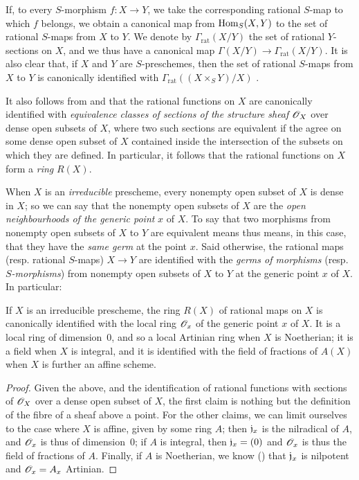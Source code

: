 If, to every $S$-morphism $f\colon X\to Y$, we take the corresponding rational $S$-map to which $f$ belongs, we obtain a canonical map from ${\mathop{\mathrm{Hom}}\nolimits}_S(X,Y)$ to the set of rational $S$-maps from $X$ to $Y$.
We denote by $\Gamma_\mathrm{rat}(X/Y)$ the set of rational $Y$-sections on $X$, and we thus have a canonical map $\Gamma(X/Y)\to\Gamma_\mathrm{rat}(X/Y)$.
It is also clear that, if $X$ and $Y$ are $S$-preschemes, then the set of rational $S$-maps from $X$ to $Y$ is canonically identified with $\Gamma_\mathrm{rat}((X\times_S Y)/X)$ .

\begin{env}[7.1.3]
\label{1.7.1.3}
It also follows from  and  that the rational functions on $X$ are canonically identified with \emph{equivalence classes of sections of the structure sheaf $\mathscr{O}_X$} over dense open subsets of $X$, where two such sections are equivalent if the agree on some dense open subset of $X$ contained inside the intersection of the subsets on which they are defined.
In particular, it follows that the rational functions on $X$ form a \emph{ring} $R(X)$.
\end{env}

\begin{env}[7.1.4]
\label{1.7.1.4}
When $X$ is an \emph{irreducible} prescheme, every nonempty open subset of $X$ is dense in $X$; so we can say that the nonempty open subsets of $X$ are the \emph{open neighbourhoods of the generic point} $x$ of $X$.
To say that two morphisms from nonempty open subsets of $X$ to $Y$ are equivalent means thus means, in this case, that they have the \emph{same germ} at the point $x$.
Said otherwise, the rational maps (resp. rational $S$-maps) $X\to Y$ are identified with the \emph{germs of morphisms} (resp. \emph{$S$-morphisms}) from nonempty open subsets of $X$ to $Y$ at the generic point $x$ of $X$.
In particular:
\end{env}

\begin{prop}[7.1.5]
\label{1.7.1.5}
If $X$ is an irreducible prescheme, the ring $R(X)$ of rational maps on $X$ is canonically identified with the local ring $\mathscr{O}_x$ of the generic point $x$ of $X$.
It is a local ring of dimension~0, and so a local Artinian ring when $X$ is Noetherian; it is a field when $X$ is integral, and it is identified with the field of fractions of $A(X)$ when $X$ is further an affine scheme.
\end{prop}

\begin{proof}
\label{proof-1.7.1.5}
Given the above, and the identification of rational functions with sections of $\mathscr{O}_X$ over a dense open subset of $X$, the first claim is nothing but the definition of the fibre of a sheaf above a point.
For the other claims, we can limit ourselves to the case where $X$ is affine, given by some ring $A$; then $\mathfrak{j}_x$ is the nilradical of $A$, and $\mathscr{O}_x$ is thus of dimension~0; if $A$ is integral, then $\mathfrak{j}_x=(0)$ and $\mathscr{O}_x$ is thus the field of fractions of $A$.
Finally, if $A$ is Noetherian, we know (\cite[p.~127, cor.~4]{I-11}) that $\mathfrak{j}_x$ is nilpotent and $\mathscr{O}_x=A_x$ Artinian.
\end{proof}

